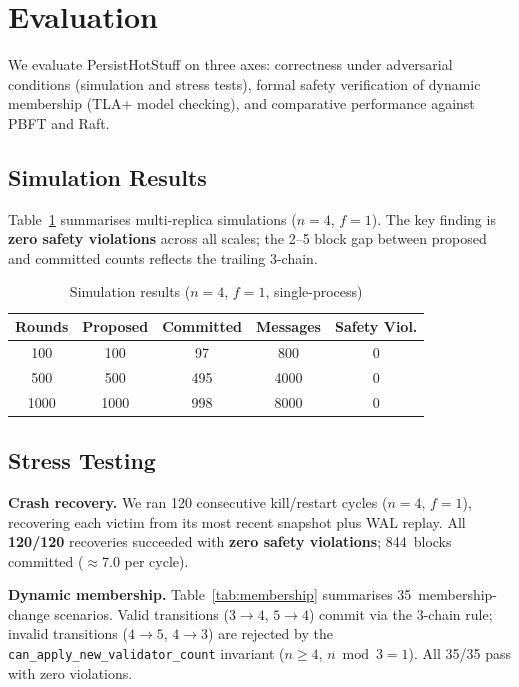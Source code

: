 \documentclass{SVProc}
\begin{document}
\section{Evaluation}
\label{sec:evaluation}

We evaluate PersistHotStuff on three axes: correctness under adversarial
conditions (simulation and stress tests), formal safety verification of
dynamic membership (TLA+ model checking), and comparative performance
against PBFT and Raft.

\subsection{Simulation Results}

Table~\ref{tab:simulation_results} summarises multi-replica simulations
($n{=}4$, $f{=}1$).  The key finding is
\textbf{zero safety violations} across all scales; the 2--5 block gap
between proposed and committed counts reflects the trailing 3-chain.

\begin{table}[t]
\caption{Simulation results ($n{=}4$, $f{=}1$, single-process)}
\centering
\begin{tabular}{ccccc}
\toprule
\textbf{Rounds} & \textbf{Proposed} & \textbf{Committed}
  & \textbf{Messages} & \textbf{Safety Viol.} \\
\midrule
100  & 100  & 97  & 800  & 0 \\
500  & 500  & 495 & 4000 & 0 \\
1000 & 1000 & 998 & 8000 & 0 \\
\bottomrule
\end{tabular}
\label{tab:simulation_results}
\end{table}

\subsection{Stress Testing}

\noindent\textbf{Crash recovery.}\quad
We ran 120 consecutive kill/restart cycles ($n{=}4$, $f{=}1$), recovering
each victim from its most recent snapshot plus WAL replay.
All \textbf{120/120} recoveries succeeded with \textbf{zero safety violations};
844~blocks committed ($\approx$7.0 per cycle).

\smallskip\noindent\textbf{Dynamic membership.}\quad
Table~\ref{tab:membership} summarises 35~membership-change scenarios.
Valid transitions ($3{\to}4$, $5{\to}4$) commit via the 3-chain rule;
invalid transitions ($4{\to}5$, $4{\to}3$) are rejected by the
\texttt{can\_apply\_new\_validator\_count} invariant ($n \ge 4$,
$n \bmod 3 = 1$).  All 35/35 pass with zero violations.
\end{document}
